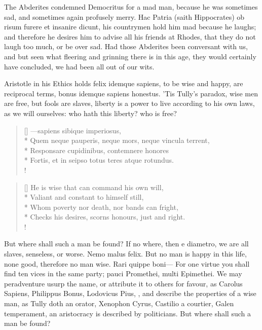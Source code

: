 {The Abderites condemned Democritus for a mad man, because he was
sometimes sad, and sometimes again profusely merry. Hac Patria (saith
Hippocrates) ob risum furere et insanire dicunt, his countrymen hold
him mad because he laughs; and therefore he desires him to advise
all his friends at Rhodes, that they do not laugh too much, or be over
sad. Had those Abderites been conversant with us, and but seen what
 fleering and grinning there is in this age, they would certainly
have concluded, we had been all out of our wits.

Aristotle in his Ethics holds felix idemque sapiens, to be wise and
happy, are reciprocal terms, bonus idemque sapiens honestus. 'Tis 
Tully's paradox, wise men are free, but fools are slaves, liberty is a
power to live according to his own laws, as we will ourselves: who hath
this liberty? who is free?

\settowidth{\versewidth}{Quem neque pauperis, neque mors, neque vincula terrent,}
\begin{verse}[\versewidth]
---sapiens sibique imperiosus,\\*
Quem neque pauperis, neque mors, neque vincula terrent,\\*
Responsare cupidinibus, contemnere honores\\*
Fortis, et in seipso totus teres atque rotundus.\\!
\end{verse}

\settowidth{\versewidth}{Checks his desires, scorns honours, just and right.}
\begin{verse}[\versewidth]
He is wise that can command his own will,\\*
Valiant and constant to himself still,\\*
Whom poverty nor death, nor bands can fright,\\*
Checks his desires, scorns honours, just and right.\\!
\end{verse}

But where shall such a man be found? If no where, then e diametro, we
are all slaves, senseless, or worse. Nemo malus felix. But no man is
happy in this life, none good, therefore no man wise. Rari quippe
boni--- For one virtue you shall find ten vices in the same party;
pauci Promethei, multi Epimethei. We may peradventure usurp the name,
or attribute it to others for favour, as Carolus Sapiens, Philippus
Bonus, Lodovicus Pius, \etc{}, and describe the properties of a wise man,
as Tully doth an orator, Xenophon Cyrus, Castilio a courtier, Galen
temperament, an aristocracy is described by politicians. But where
shall such a man be found?

}
